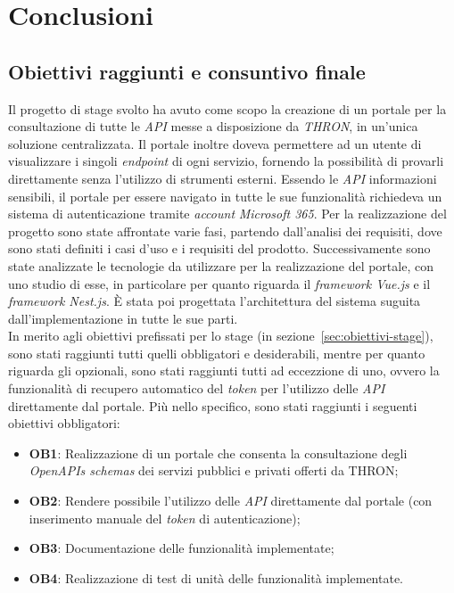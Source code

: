 \chapter{Conclusioni}\label{cap:conclusioni}


\section{Obiettivi raggiunti e consuntivo finale}
Il progetto di stage svolto ha avuto come scopo la creazione di un portale per la consultazione di tutte le \textit{API} messe a disposizione da \textit{THRON}, in un'unica soluzione centralizzata. 
Il portale inoltre doveva permettere ad un utente di visualizzare i singoli \textit{endpoint} di ogni servizio, fornendo la possibilità di provarli direttamente senza l'utilizzo di strumenti esterni.
Essendo le \textit{API} informazioni sensibili, il portale per essere navigato in tutte le sue funzionalità richiedeva un sistema di autenticazione tramite \textit{account} \textit{Microsoft 365}.
Per la realizzazione del progetto sono state affrontate varie fasi, partendo dall'analisi dei requisiti, dove sono stati definiti i casi d'uso e i requisiti del prodotto.
Successivamente sono state analizzate le tecnologie da utilizzare per la realizzazione del portale, con uno studio di esse, in particolare per quanto riguarda il \textit{framework Vue.js} e il \textit{framework Nest.js}.
È stata poi progettata l'architettura del sistema suguita dall'implementazione in tutte le sue parti.\\

In merito agli obiettivi prefissati per lo stage (in sezione~\ref{sec:obiettivi-stage}), sono stati raggiunti tutti quelli obbligatori e desiderabili, mentre per quanto riguarda gli opzionali, sono stati raggiunti tutti ad eccezzione di uno, ovvero la funzionalità di recupero automatico del \textit{token} per l'utilizzo delle \textit{API} direttamente dal portale.
Più nello specifico, sono stati raggiunti i seguenti obiettivi obbligatori:
\begin{itemize}
  \item \textbf{OB1}: Realizzazione di un portale che consenta la consultazione degli \textit{OpenAPIs schemas} dei servizi pubblici e privati offerti da THRON;
  \item \textbf{OB2}: Rendere possibile l'utilizzo delle \textit{API} direttamente dal portale (con inserimento manuale del \textit{token} di autenticazione);
  \item \textbf{OB3}: Documentazione delle funzionalità implementate;
  \item \textbf{OB4}: Realizzazione di test di unità delle funzionalità implementate.
\end{itemize}

